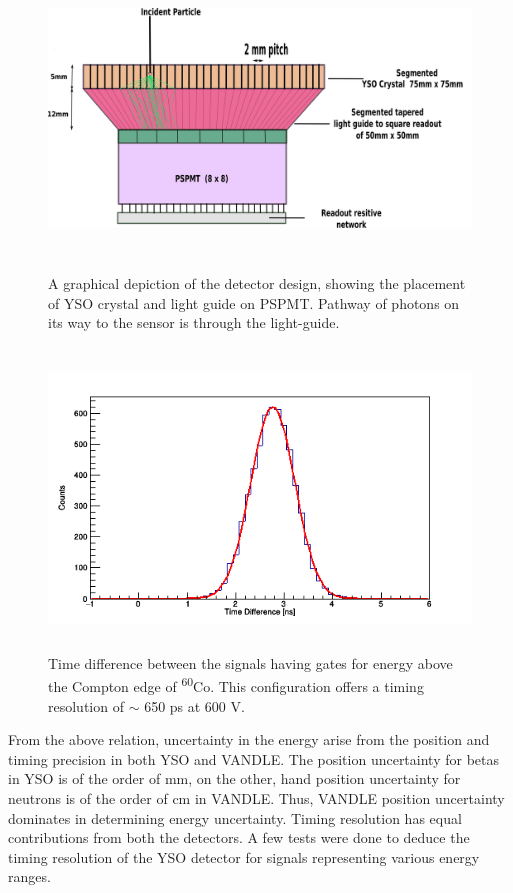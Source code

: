 \documentclass[a4paper,12pt,twoside]{report}
\begin{document}
\begin{figure}[h!]
    \centering
    \includegraphics[width=14cm,height=8cm]{yso_lightguide.png}
    \caption[A graphical depiction of the detector design]{A graphical depiction of the detector design, showing the placement of YSO crystal and light guide on PSPMT. Pathway of photons on its way to the sensor is through the light-guide.}
    \label{fig:yso_riken_2018}
\end{figure}
\newpage
\begin{figure}[h!]
    \centering
    \includegraphics[width=12cm, height=8cm]{YSO_timing.png}
    \caption[Time difference between the signals having gates]{Time difference between the signals having gates for energy above the Compton edge of \textsuperscript{60}Co. This configuration offers a timing resolution of $\sim$ 650 ps at 600 V. }
    \label{fig:time_resolution}
\end{figure}

From the above relation, uncertainty in the energy arise from the position and timing precision in both YSO and VANDLE. The position uncertainty for betas in YSO is of the order of mm, on the other, hand position uncertainty for neutrons is of the order of cm in VANDLE. Thus, VANDLE position uncertainty dominates in determining energy uncertainty. Timing resolution has equal contributions from both the detectors. A few tests were done to deduce the timing resolution of the YSO detector for signals representing various energy ranges. 
\end{document}
